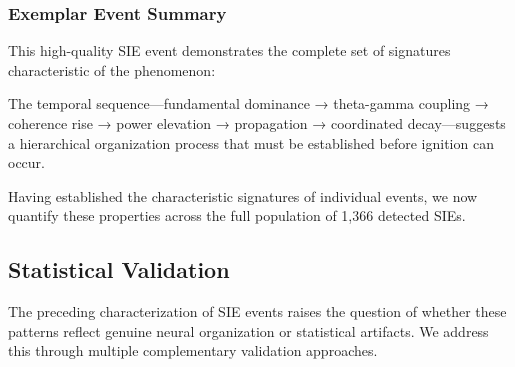 \documentclass[11pt,a4paper]{article}
\begin{document}
\subsubsection{Exemplar Event Summary}
This high-quality SIE event demonstrates the complete set of signatures characteristic of the phenomenon:
\begin{table}[H]
    \centering
     \end{table}

The temporal sequence—fundamental dominance → theta-gamma coupling → coherence rise → power elevation → propagation → coordinated decay—suggests a hierarchical organization process that must be established before ignition can occur.

Having established the characteristic signatures of individual events, we now quantify these properties across the full population of 1,366 detected SIEs.

\subsection{Statistical Validation}
The preceding characterization of SIE events raises the question of whether these patterns reflect genuine neural organization or statistical artifacts. We address this through multiple complementary validation approaches.
\end{document}

